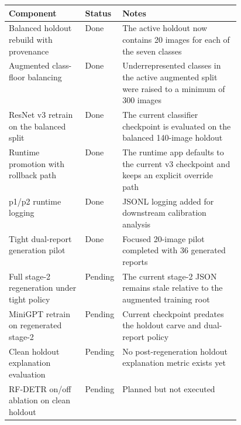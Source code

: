 \begin{tabularx}{\linewidth}{>{\raggedright\arraybackslash}p{0.33\linewidth} >{\raggedright\arraybackslash}p{0.13\linewidth} X}
\toprule
Component & Status & Notes \\
\midrule
Balanced holdout rebuild with provenance & Done & The active holdout now contains 20 images for each of the seven classes \\
Augmented class-floor balancing & Done & Underrepresented classes in the active augmented split were raised to a minimum of 300 images \\
ResNet v3 retrain on the balanced split & Done & The current classifier checkpoint is evaluated on the balanced 140-image holdout \\
Runtime promotion with rollback path & Done & The runtime app defaults to the current v3 checkpoint and keeps an explicit override path \\
p1/p2 runtime logging & Done & JSONL logging added for downstream calibration analysis \\
Tight dual-report generation pilot & Done & Focused 20-image pilot completed with 36 generated reports \\
Full stage-2 regeneration under tight policy & Pending & The current stage-2 JSON remains stale relative to the augmented training root \\
MiniGPT retrain on regenerated stage-2 & Pending & Current checkpoint predates the holdout carve and dual-report policy \\
Clean holdout explanation evaluation & Pending & No post-regeneration holdout explanation metric exists yet \\
RF-DETR on/off ablation on clean holdout & Pending & Planned but not executed \\
\bottomrule
\end{tabularx}
